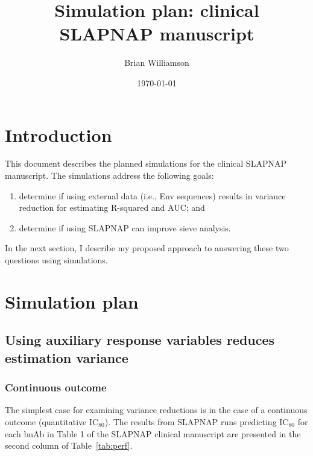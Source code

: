 \documentclass[10pt]{article}
\author{Brian Williamson}
\title{Simulation plan: clinical SLAPNAP manuscript}
\date{\today}
\begin{document}
\maketitle

\section{Introduction}

This document describes the planned simulations for the clinical SLAPNAP manuscript. The simulations address the following goals:
\begin{enumerate}
    \item determine if using external data (i.e., Env sequences) results in variance reduction for estimating R-squared and AUC; and
    \item determine if using SLAPNAP can improve sieve analysis.
\end{enumerate}
In the next section, I describe my proposed approach to answering these two questions using simulations.

\section{Simulation plan}
\subsection{Using auxiliary response variables reduces estimation variance}
\subsubsection{Continuous outcome}
The simplest case for examining variance reductions is in the case of a continuous outcome (quantitative IC$_{80}$). The results from SLAPNAP runs predicting IC$_{80}$ for each bnAb in Table 1 of the SLAPNAP clinical manuscript are presented in the second column of Table~\ref{tab:perf}.
\end{document}
